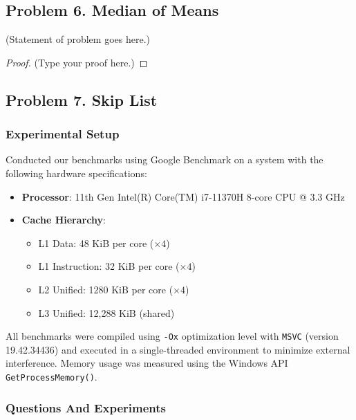 \documentclass[12pt]{article}
\begin{document}
	\vspace{2in} %
	
	
	\subsection*{Problem 6. Median of Means}
	(Statement of problem goes here.)\\
	
	\begin{proof}
		(Type your proof here.)
	\end{proof}
	
	\vspace{2in} %
	
	
	\subsection*{Problem 7. Skip List}
	\vspace{20pt}
	\subsubsection*{Experimental Setup}
	Conducted our benchmarks using Google Benchmark on a system with the following hardware specifications:

\begin{itemize}
    \item \textbf{Processor}: 11th Gen Intel(R) Core(TM) i7-11370H 8-core CPU @ 3.3 GHz
    \item \textbf{Cache Hierarchy}:
    \begin{itemize}
        \item L1 Data: 48 KiB per core (\(\times 4\))
        \item L1 Instruction: 32 KiB per core (\(\times 4\))
        \item L2 Unified: 1280 KiB per core (\(\times 4\))
        \item L3 Unified: 12,288 KiB (shared)
    \end{itemize}
\end{itemize}

All benchmarks were compiled using \texttt{-Ox} optimization level with \texttt{MSVC} (version 19.42.34436) and executed in a single-threaded environment to minimize external interference. Memory usage was measured using the Windows API \texttt{GetProcessMemory()}.\\

\subsubsection*{Questions And Experiments}
	
\end{document}
